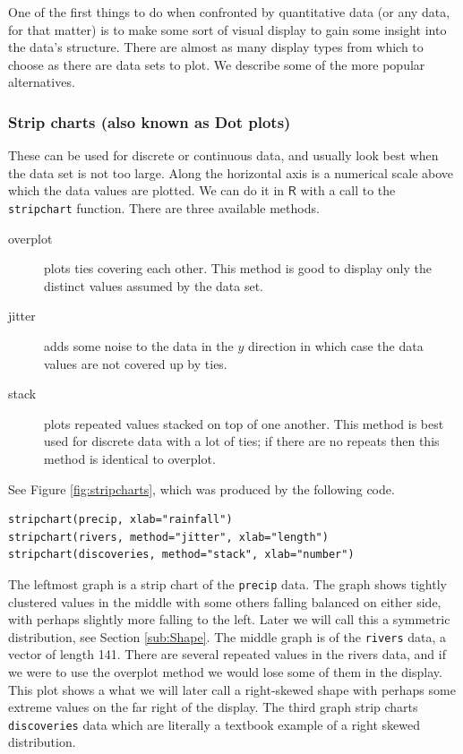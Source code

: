 \documentclass[captions=tableheading]{scrbook}
\begin{document}
One of the first things to do when confronted by quantitative data (or any data, for that matter) is to make some sort of visual display to gain some insight into the data's structure. There are almost as many display types from which to choose as there are data sets to plot. We describe some of the more popular alternatives. 
\subsubsection{Strip charts (also known as Dot plots)}
\label{sec-2-1-2-1}
\label{par:Strip-charts}


These can be used for discrete or continuous data, and usually look best when the data set is not too large. Along the horizontal axis is a numerical scale above which the data values are plotted. We can do it in \(\mathsf{R}\) with a call to the \texttt{stripchart} function. There are three available methods.

\begin{description}
\item[overplot] plots ties covering each other. This method is good to display only the distinct values assumed by the data set.
\item[jitter] adds some noise to the data in the \(y\) direction in which case the data values are not covered up by ties.
\item[stack] plots repeated values stacked on top of one another. This method is best used for discrete data with a lot of ties; if there are no repeats then this method is identical to overplot.
\end{description}

See Figure \ref{fig:stripcharts}, which was produced by the following code.


\begin{verbatim}
stripchart(precip, xlab="rainfall")
stripchart(rivers, method="jitter", xlab="length")
stripchart(discoveries, method="stack", xlab="number")
\end{verbatim}

The leftmost graph is a strip chart of the \texttt{precip} data. The graph shows tightly clustered values in the middle with some others falling balanced on either side, with perhaps slightly more falling to the left. Later we will call this a symmetric distribution, see Section \ref{sub:Shape}. The middle graph is of the \texttt{rivers} data, a vector of length 141. There are several repeated values in the rivers data, and if we were to use the overplot method we would lose some of them in the display. This plot shows a what we will later call a right-skewed shape with perhaps some extreme values on the far right of the display. The third graph strip charts \texttt{discoveries} data which are literally a textbook example of a right skewed distribution.
\end{document}

